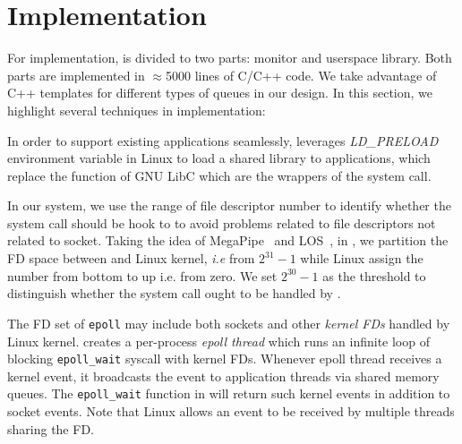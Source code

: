 \section{Implementation}
\label{sec:implementation}

For implementation, \libipc is divided to two parts: monitor and userspace library. Both parts are implemented in $\approx$5000 lines of C/C++ code. We take advantage of C++ templates for different types of queues in our design. %
In this section, we highlight several techniques in implementation:


In order to support existing applications seamlessly, \libipc leverages \textit{LD\_PRELOAD} environment variable in Linux to load a shared library to applications, which replace the function of GNU LibC which are the wrappers of the system call.

In our system, we use the range of file descriptor number to identify whether the system call should be hook to \libipc to avoid problems related to file descriptors not related to socket. Taking the idea of MegaPipe~\cite{han2012megapipe} and LOS~\cite{huang2017high}, in \libipc, we partition the FD space between \libipc and Linux kernel, \textit{i.e} from $2^{31}-1$ while Linux assign the number from bottom to up i.e. from zero. We set $2^{30} - 1 $ as the threshold to distinguish whether the system call ought to be handled by \libipc.

The FD set of \texttt{epoll} may include both sockets and other \textit{kernel FDs} handled by Linux kernel.
\libipc{} creates a per-process \textit{epoll thread} which runs an infinite loop of blocking \texttt{epoll\_wait} syscall with kernel FDs. Whenever epoll thread receives a kernel event, it broadcasts the event to application threads via shared memory queues. The \texttt{epoll\_wait} function in \libipc{} will return such kernel events in addition to socket events. Note that Linux allows an event to be received by multiple threads sharing the FD.


